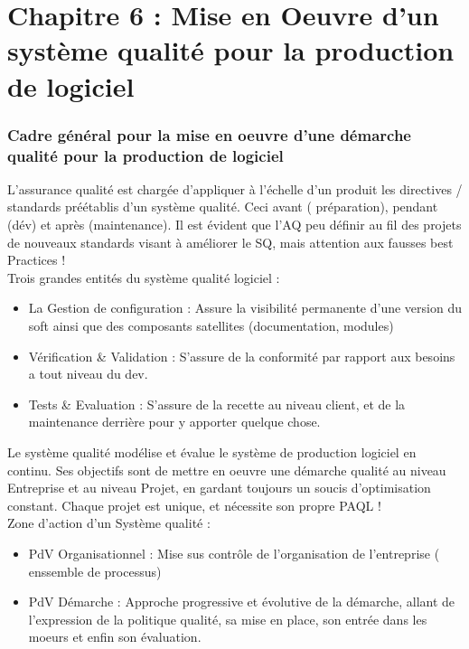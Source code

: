 \part{Chapitre 6 : Mise en Oeuvre d’un système qualité pour la production de logiciel} 

\section{Cadre général pour la mise en oeuvre d’une démarche qualité pour la production de logiciel}


L’assurance qualité est chargée d’appliquer à l’échelle d’un produit les directives / standards préétablis d’un système qualité. Ceci avant ( préparation), pendant (dév) et après (maintenance).
Il est évident que l’AQ peu définir au fil des projets de nouveaux standards visant à améliorer le SQ, mais attention aux fausses best Practices ! \\

Trois grandes entités du système qualité logiciel :\\
\begin{itemize}
\item La Gestion de configuration : Assure la visibilité permanente d’une version du soft ainsi que des composants satellites (documentation, modules)
\item Vérification \& Validation  : S’assure de la conformité par rapport aux besoins a tout niveau du dev.
\item Tests \& Evaluation :  S’assure de la recette au niveau client, et de la maintenance derrière pour y apporter quelque chose.
\end{itemize}


Le système qualité modélise et évalue  le système de production logiciel en continu. 
Ses objectifs sont de mettre en oeuvre une démarche qualité au niveau Entreprise et au niveau Projet, en gardant toujours un soucis d’optimisation constant.
Chaque projet est unique, et nécessite son propre PAQL !\\

Zone d’action d’un Système qualité :
\begin{itemize}
\item PdV Organisationnel : Mise sus contrôle de l’organisation de l’entreprise ( enssemble de processus) 
\item PdV Démarche : Approche progressive et évolutive de la démarche, allant de l’expression de la politique qualité, sa mise en place, son entrée dans les moeurs et enfin son évaluation.
\end{itemize}


